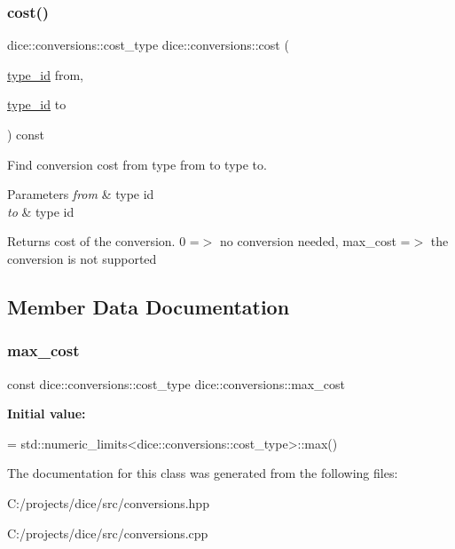 \subsubsection{\texorpdfstring{cost()}{cost()}}
{\footnotesize\ttfamily dice\+::conversions\+::cost\+\_\+type dice\+::conversions\+::cost (\begin{DoxyParamCaption}\item[{\mbox{\hyperlink{value_8hpp_ab9af7d8ecc381e026ca4d07a745f23eb}{type\+\_\+id}}}]{from,  }\item[{\mbox{\hyperlink{value_8hpp_ab9af7d8ecc381e026ca4d07a745f23eb}{type\+\_\+id}}}]{to }\end{DoxyParamCaption}) const}



Find conversion cost from type {\ttfamily from} to type {\ttfamily to}. 


\begin{DoxyParams}{Parameters}
{\em from} & type id \\
\hline
{\em to} & type id\\
\hline
\end{DoxyParams}
\begin{DoxyReturn}{Returns}
cost of the conversion. 0 =$>$ no conversion needed, max\+\_\+cost =$>$ the conversion is not supported 
\end{DoxyReturn}


\subsection{Member Data Documentation}
\mbox{\label{classdice_1_1conversions_ad0c8e703408d6a936ee83f8f31e8512b}} 
\subsubsection{\texorpdfstring{max\+\_\+cost}{max\_cost}}
{\footnotesize\ttfamily const dice\+::conversions\+::cost\+\_\+type dice\+::conversions\+::max\+\_\+cost\hspace{0.3cm}{\ttfamily [static]}}

{\bfseries Initial value\+:}
\begin{DoxyCode}
= 
    std::numeric\_limits<dice::conversions::cost\_type>::max()
\end{DoxyCode}


The documentation for this class was generated from the following files\+:\begin{DoxyCompactItemize}
\item 
C\+:/projects/dice/src/conversions.\+hpp\item 
C\+:/projects/dice/src/conversions.\+cpp\end{DoxyCompactItemize}
